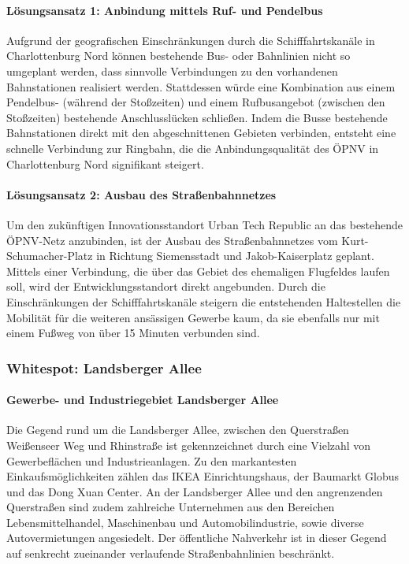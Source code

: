 \paragraph{Lösungsansatz 1: Anbindung mittels Ruf- und Pendelbus}
Aufgrund der geografischen Einschränkungen durch die Schifffahrtskanäle in Charlottenburg Nord können bestehende Bus- oder Bahnlinien nicht so umgeplant werden, dass sinnvolle Verbindungen zu den vorhandenen Bahnstationen realisiert werden. Stattdessen würde eine Kombination aus einem Pendelbus- (während der Stoßzeiten) und einem Rufbusangebot (zwischen den Stoßzeiten) bestehende Anschlusslücken schließen. Indem die Busse bestehende Bahnstationen direkt mit den abgeschnittenen Gebieten verbinden, entsteht eine schnelle Verbindung zur Ringbahn, die die Anbindungsqualität des ÖPNV in Charlottenburg Nord signifikant steigert.

\paragraph{Lösungsansatz 2: Ausbau des Straßenbahnnetzes}
Um den zukünftigen Innovationsstandort Urban Tech Republic an das bestehende ÖPNV-Netz anzubinden, ist der Ausbau des Straßenbahnnetzes vom Kurt-Schumacher-Platz in Richtung Siemensstadt und Jakob-Kaiserplatz geplant. Mittels einer Verbindung, die über das Gebiet des ehemaligen Flugfeldes laufen soll, wird der Entwicklungsstandort direkt angebunden. Durch die Einschränkungen der Schifffahrtskanäle steigern die entstehenden Haltestellen die Mobilität für die weiteren ansässigen Gewerbe kaum, da sie ebenfalls nur mit einem Fußweg von über 15 Minuten verbunden sind.









\subsubsection{Whitespot: Landsberger Allee}
\paragraph{Gewerbe- und Industriegebiet Landsberger Allee}
Die Gegend rund um die Landsberger Allee, zwischen den Querstraßen Weißenseer Weg und Rhinstraße ist gekennzeichnet durch eine Vielzahl von Gewerbeflächen und Industrieanlagen. Zu den markantesten Einkaufsmöglichkeiten zählen das IKEA Einrichtungshaus, der Baumarkt Globus und das Dong Xuan Center. An der Landsberger Allee und den angrenzenden Querstraßen sind zudem zahlreiche Unternehmen aus den Bereichen Lebensmittelhandel, Maschinenbau und Automobilindustrie, sowie diverse Autovermietungen angesiedelt. Der öffentliche Nahverkehr ist in dieser Gegend auf senkrecht zueinander verlaufende Straßenbahnlinien beschränkt.

